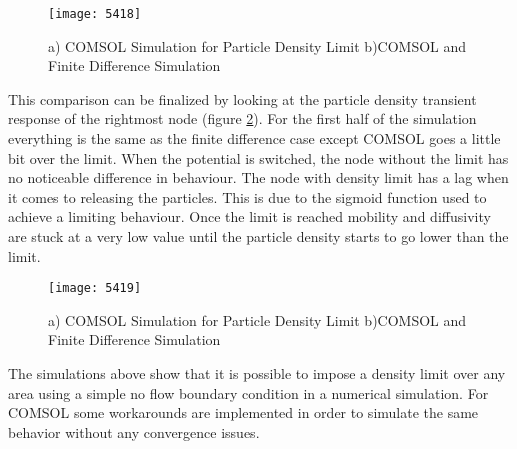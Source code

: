 \begin{doublespace}
\begin{figure}[!htp]
\centering
\texttt{[image: 5418]}
\caption{ a) COMSOL Simulation for Particle Density Limit b)COMSOL and Finite Difference Simulation} 
\label{5418}
\end{figure}

This comparison can be finalized by looking at the particle density transient response of the rightmost node (figure \ref{5419}). For the first half of the simulation everything is the same as the finite difference case except COMSOL goes a little bit over the limit. When the potential is switched, the node without the limit has no noticeable difference in behaviour. The node with density limit has a lag when it comes to releasing the particles. This is due to the sigmoid function used to achieve a limiting behaviour. Once the limit is reached mobility and diffusivity are stuck at a very low value until the particle density starts to go lower than the limit.

\begin{figure}[!htp]
\centering
\texttt{[image: 5419]}
\caption{ a) COMSOL Simulation for Particle Density Limit b)COMSOL and Finite Difference Simulation} 
\label{5419}
\end{figure}

The simulations above show that it is possible to impose a density limit over any area using a simple no flow boundary condition in a numerical simulation. For COMSOL some workarounds are implemented in order to simulate the same behavior without any convergence issues. 


\end{doublespace}
